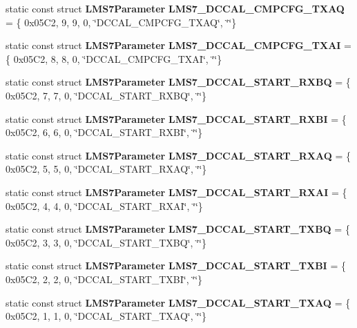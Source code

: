 \begin{DoxyCompactItemize}
\item 
static const struct {\bf L\+M\+S7\+Parameter} {\bf L\+M\+S7\+\_\+\+D\+C\+C\+A\+L\+\_\+\+C\+M\+P\+C\+F\+G\+\_\+\+T\+X\+AQ} = \{ 0x05\+C2, 9, 9, 0, \char`\"{}\+D\+C\+C\+A\+L\+\_\+\+C\+M\+P\+C\+F\+G\+\_\+\+T\+X\+A\+Q\char`\"{}, \char`\"{}\char`\"{}\}
\item 
static const struct {\bf L\+M\+S7\+Parameter} {\bf L\+M\+S7\+\_\+\+D\+C\+C\+A\+L\+\_\+\+C\+M\+P\+C\+F\+G\+\_\+\+T\+X\+AI} = \{ 0x05\+C2, 8, 8, 0, \char`\"{}\+D\+C\+C\+A\+L\+\_\+\+C\+M\+P\+C\+F\+G\+\_\+\+T\+X\+A\+I\char`\"{}, \char`\"{}\char`\"{}\}
\item 
static const struct {\bf L\+M\+S7\+Parameter} {\bf L\+M\+S7\+\_\+\+D\+C\+C\+A\+L\+\_\+\+S\+T\+A\+R\+T\+\_\+\+R\+X\+BQ} = \{ 0x05\+C2, 7, 7, 0, \char`\"{}\+D\+C\+C\+A\+L\+\_\+\+S\+T\+A\+R\+T\+\_\+\+R\+X\+B\+Q\char`\"{}, \char`\"{}\char`\"{}\}
\item 
static const struct {\bf L\+M\+S7\+Parameter} {\bf L\+M\+S7\+\_\+\+D\+C\+C\+A\+L\+\_\+\+S\+T\+A\+R\+T\+\_\+\+R\+X\+BI} = \{ 0x05\+C2, 6, 6, 0, \char`\"{}\+D\+C\+C\+A\+L\+\_\+\+S\+T\+A\+R\+T\+\_\+\+R\+X\+B\+I\char`\"{}, \char`\"{}\char`\"{}\}
\item 
static const struct {\bf L\+M\+S7\+Parameter} {\bf L\+M\+S7\+\_\+\+D\+C\+C\+A\+L\+\_\+\+S\+T\+A\+R\+T\+\_\+\+R\+X\+AQ} = \{ 0x05\+C2, 5, 5, 0, \char`\"{}\+D\+C\+C\+A\+L\+\_\+\+S\+T\+A\+R\+T\+\_\+\+R\+X\+A\+Q\char`\"{}, \char`\"{}\char`\"{}\}
\item 
static const struct {\bf L\+M\+S7\+Parameter} {\bf L\+M\+S7\+\_\+\+D\+C\+C\+A\+L\+\_\+\+S\+T\+A\+R\+T\+\_\+\+R\+X\+AI} = \{ 0x05\+C2, 4, 4, 0, \char`\"{}\+D\+C\+C\+A\+L\+\_\+\+S\+T\+A\+R\+T\+\_\+\+R\+X\+A\+I\char`\"{}, \char`\"{}\char`\"{}\}
\item 
static const struct {\bf L\+M\+S7\+Parameter} {\bf L\+M\+S7\+\_\+\+D\+C\+C\+A\+L\+\_\+\+S\+T\+A\+R\+T\+\_\+\+T\+X\+BQ} = \{ 0x05\+C2, 3, 3, 0, \char`\"{}\+D\+C\+C\+A\+L\+\_\+\+S\+T\+A\+R\+T\+\_\+\+T\+X\+B\+Q\char`\"{}, \char`\"{}\char`\"{}\}
\item 
static const struct {\bf L\+M\+S7\+Parameter} {\bf L\+M\+S7\+\_\+\+D\+C\+C\+A\+L\+\_\+\+S\+T\+A\+R\+T\+\_\+\+T\+X\+BI} = \{ 0x05\+C2, 2, 2, 0, \char`\"{}\+D\+C\+C\+A\+L\+\_\+\+S\+T\+A\+R\+T\+\_\+\+T\+X\+B\+I\char`\"{}, \char`\"{}\char`\"{}\}
\item 
static const struct {\bf L\+M\+S7\+Parameter} {\bf L\+M\+S7\+\_\+\+D\+C\+C\+A\+L\+\_\+\+S\+T\+A\+R\+T\+\_\+\+T\+X\+AQ} = \{ 0x05\+C2, 1, 1, 0, \char`\"{}\+D\+C\+C\+A\+L\+\_\+\+S\+T\+A\+R\+T\+\_\+\+T\+X\+A\+Q\char`\"{}, \char`\"{}\char`\"{}\}

\end{DoxyCompactItemize}
